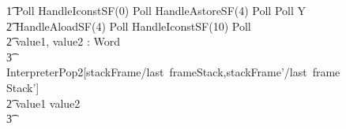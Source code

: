 \begin{figure}[tp!]
\begin{circusaction}
    \t1 Poll \circseq HandleIconstSF(0) \circseq Poll \circseq HandleAstoreSF(4) \circseq Poll \circseq Poll \circseq \circmu Y \circspot \\
    \t2 HandleAloadSF(4) \circseq Poll \circseq HandleIconstSF(10) \circseq Poll \circseq \\
    \t2 \circvar value1, value2 : Word \circspot \\
    \t3 \lschexpract InterpreterPop2[stackFrame/last~frameStack,stackFrame'/last~frameStack'] \rschexpract \circseq \\
    \t2 \circif value1 \leq value2 \circthen {} \\
    \t3 {} \cdots {}  \\

\end{circusaction}
\end{figure}
